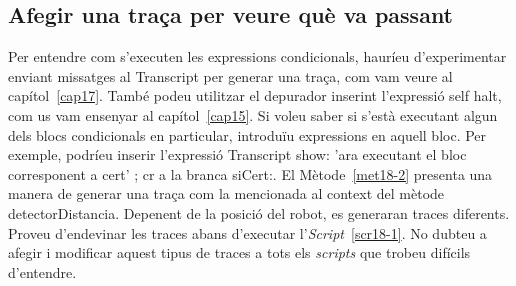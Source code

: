 \subsection{Afegir una traça per veure què va passant}
Per entendre com s'executen les expressions condicionals, hauríeu d'experimentar enviant missatges al \textsf{Transcript} per generar una traça, com vam veure al capítol~\ref{cap17}. També podeu utilitzar el depurador inserint l'expressió \textsf{self halt}, com us vam ensenyar al capítol~\ref{cap15}. Si voleu saber si s'està executant algun dels blocs condicionals en particular, introduïu expressions en aquell bloc. Per exemple, podríeu inserir l'expressió \textsf{Transcript show: 'ara executant el bloc corresponent a cert' ; cr } a la branca \textsf{siCert:}. El Mètode~\ref{met18-2} presenta una manera de generar una traça com la mencionada al context del mètode \textsf{detectorDistancia}. Depenent de la posició del robot, es generaran traces diferents. Proveu d'endevinar les traces abans d'executar l'\emph{Script}~\ref{scr18-1}. No dubteu a afegir i modificar aquest tipus de traces a tots els \emph{scripts} que trobeu difícils d'entendre.

